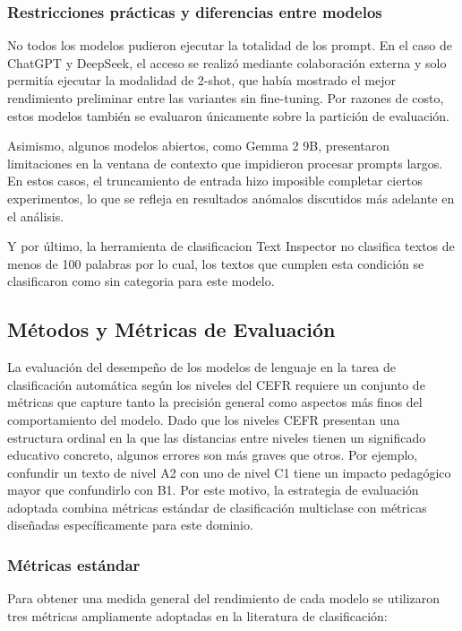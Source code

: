 \subsubsection{Restricciones prácticas y diferencias entre modelos}
No todos los modelos pudieron ejecutar la totalidad de los prompt. En el caso de ChatGPT y DeepSeek, el acceso se realizó mediante colaboración externa y solo permitía ejecutar la modalidad de 2-shot, que había mostrado el mejor rendimiento preliminar entre las variantes sin fine-tuning. Por razones de costo, estos modelos también se evaluaron únicamente sobre la partición de evaluación.

Asimismo, algunos modelos abiertos, como Gemma 2 9B, presentaron limitaciones en la ventana de contexto que impidieron procesar prompts largos. En estos casos, el truncamiento de entrada hizo imposible completar ciertos experimentos, lo que se refleja en resultados anómalos discutidos más adelante en el análisis.

Y por último, la herramienta de clasificacion Text Inspector no clasifica textos de menos de 100 palabras por lo cual, los textos que cumplen esta condición se clasificaron como sin categoria para este modelo.

\subsection{Métodos y Métricas de Evaluación}\label{subsection:clas_metrica}
La evaluación del desempeño de los modelos de lenguaje en la tarea de clasificación automática según los niveles del CEFR requiere un conjunto de métricas que capture tanto la precisión general como aspectos más finos del comportamiento del modelo. Dado que los niveles CEFR presentan una estructura ordinal en la que las distancias entre niveles tienen un significado educativo concreto, algunos errores son más graves que otros. Por ejemplo, confundir un texto de nivel A2 con uno de nivel C1 tiene un impacto pedagógico mayor que confundirlo con B1. Por este motivo, la estrategia de evaluación adoptada combina métricas estándar de clasificación multiclase con métricas diseñadas específicamente para este dominio.

\subsubsection{Métricas estándar}
Para obtener una medida general del rendimiento de cada modelo se utilizaron tres métricas ampliamente adoptadas en la literatura de clasificación:\\

